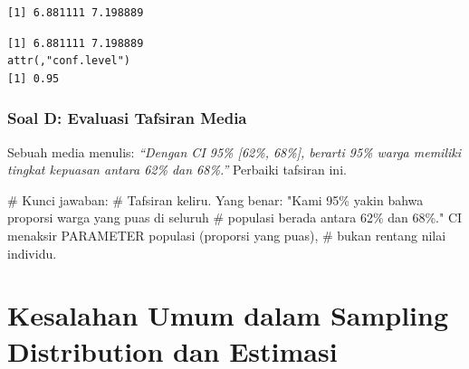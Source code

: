 \documentclass[
  indonesian,
  letterpaper,
]{book}
\newenvironment{Shaded}{\begin{snugshade}}{\end{snugshade}}
\newcommand{\CommentTok}[1]{\textcolor[rgb]{0.37,0.37,0.37}{#1}}
\newcommand{\FunctionTok}[1]{\textcolor[rgb]{0.28,0.35,0.67}{#1}}
\newcommand{\NormalTok}[1]{\textcolor[rgb]{0.00,0.23,0.31}{#1}}
\newcommand{\SpecialCharTok}[1]{\textcolor[rgb]{0.37,0.37,0.37}{#1}}
\begin{document}
\begin{verbatim}
[1] 6.881111 7.198889
\end{verbatim}

\begin{Shaded}
\end{Shaded}

\begin{verbatim}
[1] 6.881111 7.198889
attr(,"conf.level")
[1] 0.95
\end{verbatim}

\subsubsection{Soal D: Evaluasi Tafsiran
Media}\label{soal-d-evaluasi-tafsiran-media}

Sebuah media menulis: \emph{``Dengan CI 95\% {[}62\%, 68\%{]}, berarti
95\% warga memiliki tingkat kepuasan antara 62\% dan 68\%.''} Perbaiki
tafsiran ini.

\begin{Shaded}
\begin{Highlighting}[]
\CommentTok{\# Kunci jawaban:}
\CommentTok{\# Tafsiran keliru. Yang benar: "Kami 95\% yakin bahwa proporsi warga yang puas di seluruh}
\CommentTok{\# populasi berada antara 62\% dan 68\%." CI menaksir PARAMETER populasi (proporsi yang puas),}
\CommentTok{\# bukan rentang nilai individu.}
\end{Highlighting}
\end{Shaded}

\section{Kesalahan Umum dalam Sampling Distribution dan
Estimasi}\label{kesalahan-umum-dalam-sampling-distribution-dan-estimasi}
\end{document}
